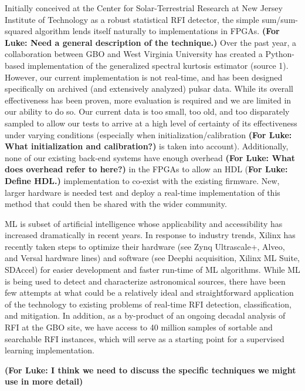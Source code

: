 \documentclass[10pt]{myNSF}
\begin{document}
 Initially conceived at the Center for
Solar-Terrestrial Research at New Jersey Institute of Technology as a
robust statistical RFI detector, the simple sum/sum-squared algorithm
lends itself naturally to implementations in FPGAs. \textbf{(For Luke:
  Need a general description of the technique.)} Over the past year, a
collaboration between GBO and West Virginia University has created a
Python-based implementation of the generalized spectral kurtosis
estimator (source 1). However, our current implementation is not
real-time, and has been designed specifically on archived (and
extensively analyzed) pulsar data.  While its overall effectiveness
has been proven, more evaluation is required and we are limited in our
ability to do so.  Our current data is too small, too old, and too
disparately sampled to allow our tests to arrive at a high level of
certainty of its effectiveness under varying conditions (especially
when initialization/calibration \textbf{(For Luke: What initialization
  and calibration?)} is taken into account). Additionally, none of our
existing back-end systems have enough overhead \textbf{(For Luke: What
  does overhead refer to here?)} in the FPGAs to allow an HDL
(\textbf{For Luke: Define HDL.)}  implementation to co-exist with the
existing firmware.  New, larger hardware is needed test and deploy a
real-time implementation of this method that could then be shared with
the wider community.

 ML is subset of artificial intelligence
whose applicability and accessibility has increased dramatically in
recent years. In response to industry trends, Xilinx has recently
taken steps to optimize their hardware (see Zynq Ultrascale+, Alveo,
and Versal hardware lines) and software (see Deephi acquisition,
Xilinx ML Suite, SDAccel) for easier development and faster run-time
of ML algorithms.  While ML is being used to detect and characterize
astronomical sources, there have been few attempts at what could be a
relatively ideal and straightforward application of the technology to
existing problems of real-time RFI detection, classification, and
mitigation.  In addition, as a by-product of an ongoing decadal
analysis of RFI at the GBO site, we have access to 40 million samples
of sortable and searchable RFI instances, which will serve as a
starting point for a supervised learning implementation.

\textbf{(For Luke: I think we need to discuss the specific techniques
  we might use in more detail)}
\end{document}
